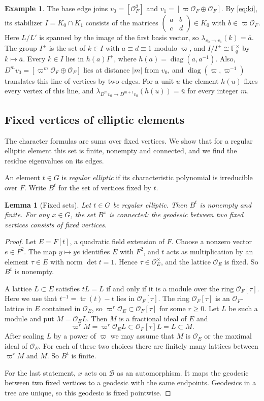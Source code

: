 \documentclass[12pt,letterpaper]{article}
\numberwithin{equation}{section}
\newtheorem{lemma}[theorem]{Lemma}
\theoremstyle{definition}
\newtheorem{example}[theorem]{Example}
\theoremstyle{remark}
\newcommand{\OO}{\mathcal O_F}
\newcommand{\OEr}{\mathcal O_E}
\newcommand{\kk}{\mathbb F_q}
\newcommand{\tr}{\operatorname{tr}}
\newcommand{\diag}{\operatorname{diag}}
\newcommand{\BT}{\mathscr B}
\newcommand{\sm}[4]{\left(\begin{smallmatrix}#1&#2\\#3&#4\end{smallmatrix}\right)}
\begin{document}
\begin{example}\label{ex:baseedge}
The base edge joins $v_0=[\OO^2]$ and $v_1=[\varpi\OO\oplus\OO]$. By \eqref{eq:ki}, its stabilizer $I=K_0\cap K_1$ consists of the matrices $\sm abcd\in K_0$ with $b\in\varpi\OO$. Here $L/L'$ is spanned by the image of the first basis vector, so $\lambda_{v_0\to v_1}(k)=\bar a$. The group $I^+$ is the set of $k\in I$ with $a\equiv d\equiv1$ modulo $\varpi$, and $I/I^+\cong\kk^\times$ by $k\mapsto\bar a$. Every $k\in I$ lies in $h(a)I^+$, where $h(a)=\diag(a,a^{-1})$. Also, $D^mv_0=[\varpi^m\OO\oplus\OO]$ lies at distance $|m|$ from $v_0$, and $\diag(\varpi,\varpi^{-1})$ translates this line of vertices by two edges. For a unit $u$ the element $h(u)$ fixes every vertex of this line, and $\lambda_{D^mv_0\to D^{m+1}v_0}(h(u))=\bar u$ for every integer $m$.
\end{example}

\subsection*{Fixed vertices of elliptic elements}
The character formulas are sums over fixed vertices. We show that for a regular elliptic element this set is finite, nonempty and connected, and we find the residue eigenvalues on its edges.

An element $t\in G$ is \emph{regular elliptic} if its characteristic polynomial is irreducible over $F$. Write $B^t$ for the set of vertices fixed by $t$.

\begin{lemma}[Fixed sets]\label{lem:fixedset}
Let $t\in G$ be regular elliptic. Then $B^t$ is nonempty and finite. For any $x\in G$, the set $B^x$ is connected: the geodesic between two fixed vertices consists of fixed vertices.
\end{lemma}
\begin{proof}
Let $E=F[t]$, a quadratic field extension of $F$. Choose a nonzero vector $e\in F^2$. The map $y\mapsto ye$ identifies $E$ with $F^2$, and $t$ acts as multiplication by an element $\tau\in E$ with norm $\det t=1$. Hence $\tau\in\OEr^\times$, and the lattice $\OEr$ is fixed. So $B^t$ is nonempty.

A lattice $L\subset E$ satisfies $tL=L$ if and only if it is a module over the ring $\OO[\tau]$. Here we use that $t^{-1}=\tr(t)-t$ lies in $\OO[\tau]$. The ring $\OO[\tau]$ is an $\OO$-lattice in $E$ contained in $\OEr$, so $\varpi^r\OEr\subset\OO[\tau]$ for some $r\ge0$. Let $L$ be such a module and put $M=\OEr L$. Then $M$ is a fractional ideal of $E$ and
\[
 \varpi^rM=\varpi^r\OEr L\subset\OO[\tau]L=L\subset M .
\]
After scaling $L$ by a power of $\varpi$ we may assume that $M$ is $\OEr$ or the maximal ideal of $\OEr$. For each of these two choices there are finitely many lattices between $\varpi^rM$ and $M$. So $B^t$ is finite.

For the last statement, $x$ acts on $\BT$ as an automorphism. It maps the geodesic between two fixed vertices to a geodesic with the same endpoints. Geodesics in a tree are unique, so this geodesic is fixed pointwise.
\end{proof}
\end{document}
